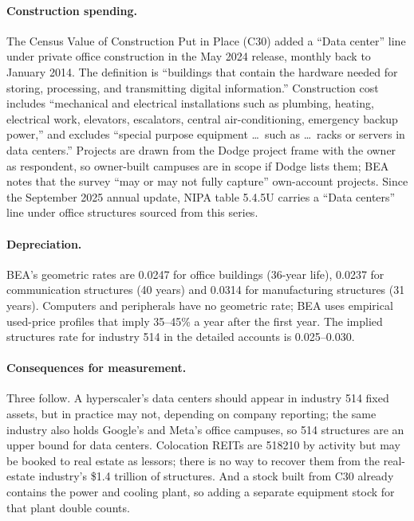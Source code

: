 \documentclass[11pt]{article}
\begin{document}
\paragraph{Construction spending.} The Census Value of Construction Put in Place (C30) added a ``Data center'' line under private office construction in the May 2024 release, monthly back to January 2014. The definition is ``buildings that contain the hardware needed for storing, processing, and transmitting digital information.'' Construction cost includes ``mechanical and electrical installations such as plumbing, heating, electrical work, elevators, escalators, central air-conditioning, emergency backup power,'' and excludes ``special purpose equipment \ldots\ such as \ldots\ racks or servers in data centers.'' Projects are drawn from the Dodge project frame with the owner as respondent, so owner-built campuses are in scope if Dodge lists them; BEA notes that the survey ``may or may not fully capture'' own-account projects. Since the September 2025 annual update, NIPA table 5.4.5U carries a ``Data centers'' line under office structures sourced from this series.

\paragraph{Depreciation.} BEA's geometric rates are 0.0247 for office buildings (36-year life), 0.0237 for communication structures (40 years) and 0.0314 for manufacturing structures (31 years). Computers and peripherals have no geometric rate; BEA uses empirical used-price profiles that imply 35--45\% a year after the first year. The implied structures rate for industry 514 in the detailed accounts is 0.025--0.030.

\paragraph{Consequences for measurement.} Three follow. A hyperscaler's data centers should appear in industry 514 fixed assets, but in practice may not, depending on company reporting; the same industry also holds Google's and Meta's office campuses, so 514 structures are an upper bound for data centers. Colocation REITs are 518210 by activity but may be booked to real estate as lessors; there is no way to recover them from the real-estate industry's \$1.4 trillion of structures. And a stock built from C30 already contains the power and cooling plant, so adding a separate equipment stock for that plant double counts.
\end{document}

